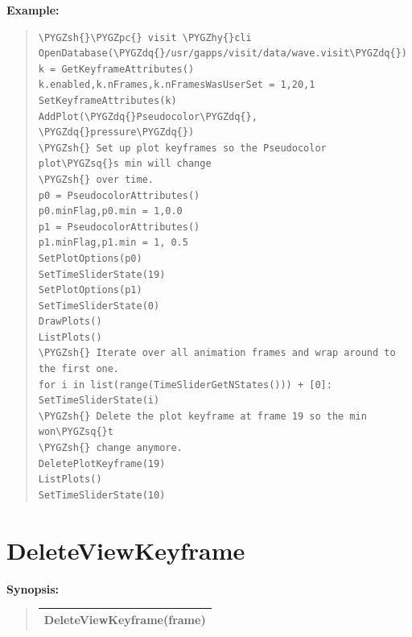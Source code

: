 \documentclass[letterpaper,10pt,english]{sphinxmanual}
\def\PYGZsh{\char`\#}
\def\PYGZpc{\char`\%}
\def\PYGZhy{\char`\-}
\def\PYGZsq{\char`\'}
\def\PYGZdq{\char`\"}
\renewcommand\PYGZsq{\textquotesingle}
\begin{document}
\begin{DUlineblock}{0em}
\item[] \textbf{Example:}
\item[] 
\end{DUlineblock}
\begin{quote}

\begin{Verbatim}[commandchars=\\\{\}]
\PYGZsh{}\PYGZpc{} visit \PYGZhy{}cli
OpenDatabase(\PYGZdq{}/usr/gapps/visit/data/wave.visit\PYGZdq{})
k = GetKeyframeAttributes()
k.enabled,k.nFrames,k.nFramesWasUserSet = 1,20,1
SetKeyframeAttributes(k)
AddPlot(\PYGZdq{}Pseudocolor\PYGZdq{}, \PYGZdq{}pressure\PYGZdq{})
\PYGZsh{} Set up plot keyframes so the Pseudocolor plot\PYGZsq{}s min will change
\PYGZsh{} over time.
p0 = PseudocolorAttributes()
p0.minFlag,p0.min = 1,0.0
p1 = PseudocolorAttributes()
p1.minFlag,p1.min = 1, 0.5
SetPlotOptions(p0)
SetTimeSliderState(19)
SetPlotOptions(p1)
SetTimeSliderState(0)
DrawPlots()
ListPlots()
\PYGZsh{} Iterate over all animation frames and wrap around to the first one.
for i in list(range(TimeSliderGetNStates())) + [0]:
SetTimeSliderState(i)
\PYGZsh{} Delete the plot keyframe at frame 19 so the min won\PYGZsq{}t
\PYGZsh{} change anymore.
DeletePlotKeyframe(19)
ListPlots()
SetTimeSliderState(10)
\end{Verbatim}
\end{quote}


\section{DeleteViewKeyframe}
\label{functions:deleteviewkeyframe}
\begin{DUlineblock}{0em}
\item[] \textbf{Synopsis:}
\end{DUlineblock}
\begin{quote}

\begin{tabulary}{\linewidth}{|L|}
\hline

DeleteViewKeyframe(frame)
\\
\hline\end{tabulary}

\end{quote}
\end{document}

